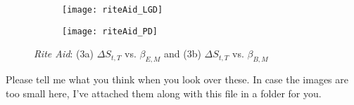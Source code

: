 \documentclass[12pt, two-sided]{article}
\begin{document}
\begin{figure}[H]
\begin{subfigure}{.5\textwidth}
  \centering
  \texttt{[image: riteAid\_LGD]}
  \caption{}
\end{subfigure}
\begin{subfigure}{.5\textwidth}
  \centering
  \texttt{[image: riteAid\_PD]}
  \caption{}
\end{subfigure}
\caption{\emph{Rite Aid}: (3a)  $\Delta S_{t,T}$ vs. $\beta_{E,M}$
			  and (3b)  $\Delta S_{t,T}$ vs. $\beta_{B,M}$}
\label{fig:fig}
\end{figure}

Please tell me what you think when you look over these. In case the images are too small here, I've attached them along with this file in a folder for you. 
\end{document}
